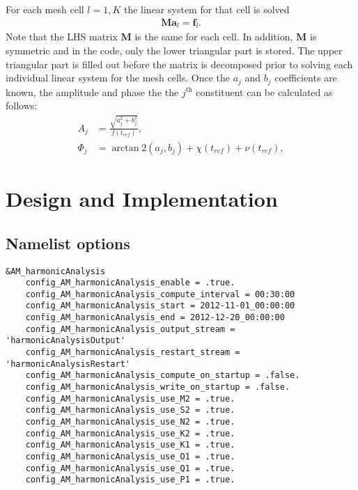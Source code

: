 \documentclass[11pt]{report}
\begin{document}
For each mesh cell $l=1,K$ the linear system for that cell is solved
\begin{align}
    \mathbf{M}\mathbf{a}_l = \mathbf{f}_l.
\end{align}
Note that the LHS matrix $\mathbf{M}$ is the same for each cell. In addition, $\mathbf{M}$ is symmetric and in the code, only the lower triangular part is stored. The upper triangular part is filled out before the matrix is decomposed prior to solving each individual linear system for the mesh cells.
Once the $a_j$ and $b_j$ coefficients are known, the amplitude and phase the the $j^\mathrm{th}$ constituent can be calculated as follows:
\begin{align}
    A_j &= \frac{\sqrt{a_j^2+b_j^2}}{f(t_{ref})}, \\
    \Phi_j &= \arctan2(a_j,b_j) + \chi(t_{ref}) + \nu(t_{ref}),
\end{align}

\chapter{Design and Implementation}

\section{Namelist options}
\begin{verbatim}
&AM_harmonicAnalysis
    config_AM_harmonicAnalysis_enable = .true.
    config_AM_harmonicAnalysis_compute_interval = 00:30:00
    config_AM_harmonicAnalysis_start = 2012-11-01_00:00:00
    config_AM_harmonicAnalysis_end = 2012-12-20_00:00:00
    config_AM_harmonicAnalysis_output_stream = 'harmonicAnalysisOutput'
    config_AM_harmonicAnalysis_restart_stream = 'harmonicAnalysisRestart'
    config_AM_harmonicAnalysis_compute_on_startup = .false.
    config_AM_harmonicAnalysis_write_on_startup = .false.
    config_AM_harmonicAnalysis_use_M2 = .true.
    config_AM_harmonicAnalysis_use_S2 = .true.
    config_AM_harmonicAnalysis_use_N2 = .true.
    config_AM_harmonicAnalysis_use_K2 = .true.
    config_AM_harmonicAnalysis_use_K1 = .true.
    config_AM_harmonicAnalysis_use_O1 = .true.
    config_AM_harmonicAnalysis_use_Q1 = .true.
    config_AM_harmonicAnalysis_use_P1 = .true.
\end{verbatim}
\end{document}
